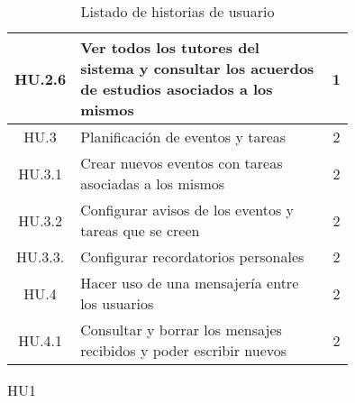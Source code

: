 \begin{table}[h]
\begin{center}
\begin{adjustbox}{width=1\textwidth}
\begin{tabular}{ | c | >{\centering\arraybackslash}p{0.75\linewidth} | c | }
				HU.2.6 \label{HU2.6} & Ver todos los tutores del sistema y consultar los acuerdos de estudios asociados a los mismos & 1 \\
				\hline
				HU.3 \label{HU.3} & Planificación de eventos y tareas & 2 \\
				\hline
				HU.3.1 \label{HU.3.1} & Crear nuevos eventos con tareas asociadas a los mismos & 2 \\
				\hline
				HU.3.2 \label{HU.3.2} & Configurar avisos de los eventos y tareas que se creen & 2 \\
				\hline
				HU.3.3. \label{HU.3.3} & Configurar recordatorios personales & 2 \\
				\hline
				HU.4 \label{HU.4} & Hacer uso de una mensajería entre los usuarios & 2 \\
				\hline
				HU.4.1 \label{HU.4.1} & Consultar y borrar los mensajes recibidos y poder escribir nuevos & 2 \\
				\hline			
			\end{tabular}	
		\end{adjustbox}
		\caption{Listado de historias de usuario}
		\label{tab:listadoHU}
	\end{center}
\end{table}

\begin{table}[h]
	\begin{center}
		\begin{tabular}{ | c | c | c | } 
			\hline
			
			\hline			
		\end{tabular}	
		\caption{HU1}
		\label{tab:HU1}
	\end{center}
\end{table}



